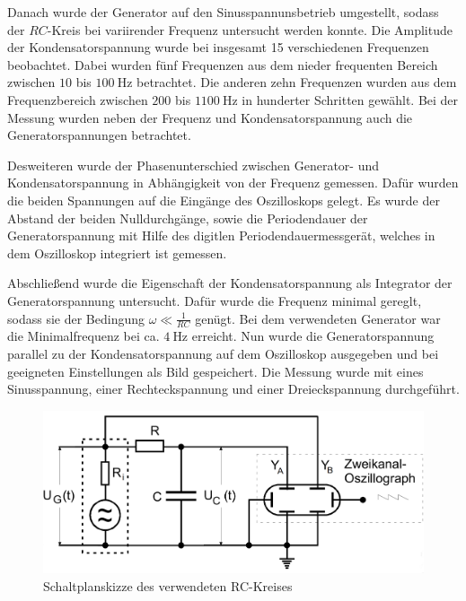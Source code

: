 Danach wurde der Generator auf den Sinusspannunsbetrieb umgestellt, sodass
der $RC$-Kreis bei variirender Frequenz untersucht werden konnte.
Die Amplitude der Kondensatorspannung wurde bei insgesamt 15 verschiedenen
Frequenzen beobachtet. Dabei wurden fünf Frequenzen aus dem nieder
frequenten Bereich zwischen $10$ bis $\SI{100}{\hertz}$ betrachtet. Die
anderen zehn Frequenzen wurden aus dem Frequenzbereich zwischen $200$ bis
$\SI{1100}{\hertz}$ in hunderter Schritten gewählt. Bei der Messung wurden
neben der Frequenz und Kondensatorspannung auch die Generatorspannungen betrachtet.

Desweiteren wurde der Phasenunterschied zwischen Generator- und Kondensatorspannung
in Abhängigkeit von der Frequenz gemessen. Dafür wurden die beiden Spannungen
auf die Eingänge des Oszilloskops gelegt. Es wurde der Abstand der beiden
Nulldurchgänge, sowie die Periodendauer der Generatorspannung mit Hilfe
des digitlen Periodendauermessgerät, welches in dem Oszilloskop integriert ist
gemessen.

Abschließend wurde die Eigenschaft der Kondensatorspannung als Integrator
der Generatorspannung untersucht. Dafür wurde die Frequenz minimal gereglt,
sodass sie der Bedingung $\omega\ll \frac{1}{RC}$ genügt. Bei dem verwendeten
Generator war die Minimalfrequenz bei ca. $\SI{4}{\hertz}$ erreicht.
Nun wurde die Generatorspannung parallel zu der Kondensatorspannung auf dem
Oszilloskop ausgegeben und bei geeigneten Einstellungen als Bild gespeichert.
Die Messung wurde mit eines Sinusspannung, einer Rechteckspannung und einer
Dreieckspannung durchgeführt.\\

\FloatBarrier
\begin{figure}
  \includegraphics[width=\textwidth]{Aufbau_V353.PNG}
  \caption{Schaltplanskizze des verwendeten RC-Kreises}
  \label{fig:Aufbau}
\end{figure}

\newpage




